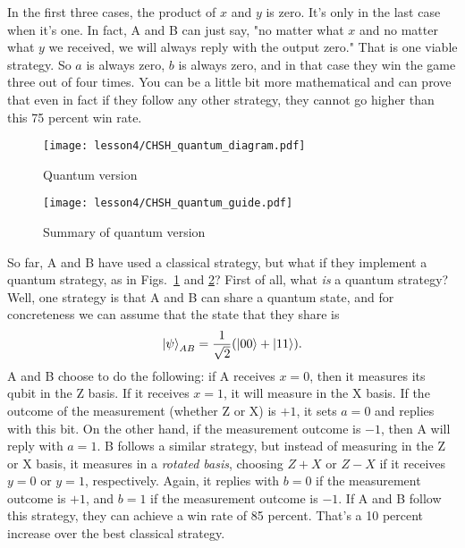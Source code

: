 In the first three cases, the product of $x$ and $y$ is zero. It's only in the last case when it's one. In fact, A and B can just say, "no matter what $x$ and no matter what $y$ we received, we will always reply with the output zero." That is one viable strategy. So $a$ is always zero, $b$ is always zero, and in that case they win the game three out of four times. You can be a little bit more mathematical and can prove that even in fact if they follow any other strategy, they cannot go higher than this 75 percent win rate. 


\begin{figure}[H]
    \centering
    \texttt{[image: lesson4/CHSH\_quantum\_diagram.pdf]}
        \caption{Quantum version}
    \label{fig:chsh-quantum}
\end{figure}

\begin{figure}[H]
    \centering
    \texttt{[image: lesson4/CHSH\_quantum\_guide.pdf]}
        \caption{Summary of quantum version}
    \label{fig:chsh-quantum-summary}
\end{figure}

So far, A and B have used a classical strategy, but what if they implement a quantum strategy, as in Figs.~\ref{fig:chsh-quantum} and \ref{fig:chsh-quantum-summary}? First of all, what \emph{is} a quantum strategy? Well, one strategy is that A and B can share a quantum state, and for concreteness we can assume that the state that they share is 
\begin{equation}
\left| \psi \right\rangle_{AB} = \frac{1}{\sqrt2}(\left| 00 \right\rangle + \left| 11 \right\rangle).
\end{equation}
A and B choose to do the following: if A receives $x=0$, then it measures its qubit in the Z basis. If it receives $x=1$, it will measure in the X basis. If the outcome of the measurement (whether Z or X) is $+1$, it sets $a=0$ and replies with this bit. On the other hand, if the measurement outcome is $-1$, then A will reply with $a=1$. B follows a similar strategy, but instead of measuring in the Z or X basis, it measures in a \emph{rotated basis}, choosing $Z+X$ or $Z-X$ if it receives $y=0$ or $y=1$, respectively. Again, it replies with $b=0$ if the measurement outcome is $+1$, and $b=1$ if the measurement outcome is $-1$. If A and B follow this strategy, they can achieve a win rate of 85 percent. That's a 10 percent increase over the best classical strategy.

